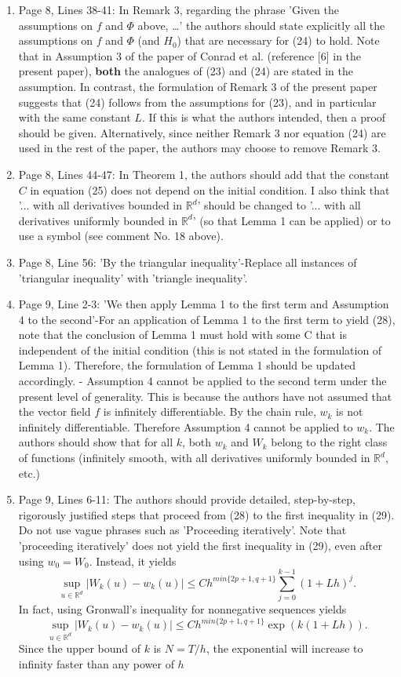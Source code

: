 \documentclass{article}
\begin{document}
\begin{enumerate}[label=(\arabic*)]
		\item Page 8, Lines 38-41: In Remark 3, regarding the phrase 'Given the assumptions on $f$ and $\Phi$ above, …' the authors should state explicitly all the assumptions on $f$ and $\Phi$ (and $H_0$) that are necessary for (24) to hold. Note that in Assumption 3 of the paper of Conrad et al. (reference [6] in the present paper), \textbf{both} the analogues of (23) and (24) are stated in the assumption. In contrast, the formulation of Remark 3 of the present paper suggests that (24) follows from the assumptions for (23), and in particular with the same constant $L$. If this is what the authors intended, then a proof should be given. Alternatively, since neither Remark 3 nor equation (24) are used in the rest of the paper, the authors may choose to remove Remark 3.
		\item Page 8, Lines 44-47: In Theorem 1, the authors should add that the constant $C$ in equation (25) does not depend on the initial condition. I also think that '... with all derivatives bounded in $\mathbb{R}^d$' should be changed to '... with all derivatives uniformly bounded in $\mathbb{R}^d$' (so that Lemma 1 can be applied) or to use a symbol (see comment No. 18 above).
		\item Page 8, Line 56: 'By the triangular inequality'-Replace all instances of 'triangular inequality' with 'triangle inequality'.
		\item Page 9, Line 2-3: 'We then apply Lemma 1 to the first term and Assumption 4 to the second'-For an application of Lemma 1 to the first term to yield (28), note that the conclusion of Lemma 1 must hold with some C that is independent of the initial condition (this is not stated in the formulation of Lemma 1). Therefore, the formulation of Lemma 1 should be updated accordingly. - Assumption 4 cannot be applied to the second term under the present level of generality. This is because the authors have not assumed that the vector field $f$ is infinitely differentiable. By the chain rule, $w_k$ is not infinitely differentiable. Therefore Assumption 4 cannot be applied to $w_k$. The authors should show that for all $k$, both $w_k$ and $W_k$ belong to the right class of functions (infinitely smooth, with all derivatives uniformly bounded in $\mathbb{R}^d$, etc.)
		\item Page 9, Lines 6-11: The authors should provide detailed, step-by-step, rigorously justified steps that proceed from (28) to the first inequality in (29). Do not use vague phrases such as 'Proceeding iteratively'. Note that 'proceeding iteratively' does not yield the first inequality in (29), even after using $w_0=W_0$. Instead, it yields $$\sup_{u\in\mathbb{R}^d}\vert W_k(u)-w_k(u)\vert \leq Ch^{min\{2p+1,q+1\}}\sum_{j=0}^{k-1}(1+Lh)^j.$$ In fact, using Gronwall's inequality for nonnegative sequences yields $$\sup_{u\in\mathbb{R}^d}\vert W_k(u)-w_k(u)\vert \leq Ch^{min\{2p+1,q+1\}}\exp\left(k(1+Lh)\right).$$ Since the upper bound of $k$ is $N=T/h$, the exponential will increase to infinity faster than any power of $h$

\end{enumerate}
\end{document}
